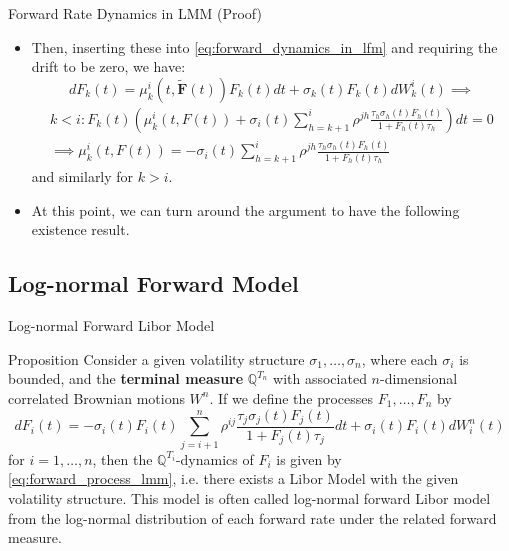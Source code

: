 \documentclass{beamer}
\begin{document}
\begin{frame}{Forward Rate Dynamics in LMM (Proof)}
	\begin{itemize}
		\item<1-> Then, inserting these into \cref{eq:forward_dynamics_in_lfm} and requiring the drift to be zero, we have:
		\begin{equation*}
			dF_k(t) = \mu_k^i(t, \bm{\tilde{F}}(t))F_k(t)dt + \sigma_k(t)F_k(t)dW^i_k(t) \implies
		\end{equation*}
		\begin{equation*}
			\begin{gathered}
				k < i : F_k(t)\left( \mu_k^i(t, F(t)) + \sigma_i(t)\sum_{h=k+1}^i \rho^{jh} \frac{\tau_h\sigma_h(t)F_h(t)}{1+F_h(t)\tau_h}\right) dt = 0 \\
				\implies \mu_k^i(t, F(t)) = - \sigma_i(t)\sum_{h=k+1}^i \rho^{jh} \frac{\tau_h\sigma_h(t)F_h(t)}{1+F_h(t)\tau_h}
			\end{gathered}
		\end{equation*}
		and similarly for $k > i$.
		\myendproof
		\item<2-> At this point, we can turn around the argument to have the following existence result.
	\end{itemize}
\end{frame}

\subsection{Log-normal Forward Model}
\begin{frame}{Log-normal Forward Libor Model}
	\begin{block}{Proposition}
		Consider a given volatility structure $\sigma_1,\ldots, \sigma_n$, where each $\sigma_i$ is bounded, and the \textbf{terminal measure} $\mathbb{Q}^{T_n}$ with associated $n$-dimensional correlated Brownian motions $W^n$. If we define the processes $F_1,\ldots, F_n$ by
		\begin{equation}
			dF_i(t) = -\sigma_i(t)F_i(t)\sum_{j=i+1}^n \rho^{ij} \frac{\tau_j\sigma_j(t)F_j(t)}{1+F_j(t)\tau_j} dt + \sigma_i(t)F_i(t)dW^n_i(t)
		\end{equation}
		for $i = 1,\ldots, n$, then the $\mathbb{Q}^{T_i}$-dynamics of $F_i$ is given by \cref{eq:forward_process_lmm}, i.e. there exists a Libor Model with the given volatility structure.
		This model is often called \textcolor{maincolor}{log-normal forward Libor model} from the log-normal distribution of each forward rate under the related forward measure.
	\end{block}
\end{frame}
\end{document}
